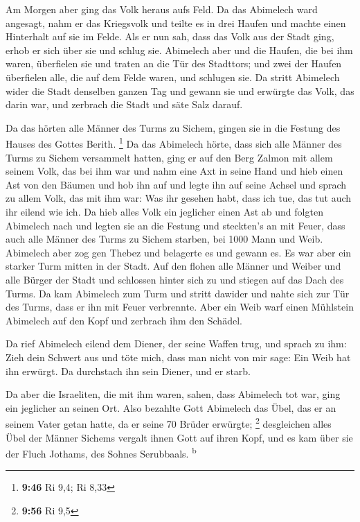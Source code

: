  Am Morgen aber ging das Volk heraus aufs Feld. Da das
Abimelech ward angesagt,  nahm er das Kriegsvolk und
teilte es in drei Haufen und machte einen Hinterhalt auf sie im Felde.
Als er nun sah, dass das Volk aus der Stadt ging, erhob er sich über sie
und schlug sie.  Abimelech aber und die Haufen, die bei
ihm waren, überfielen sie und traten an die Tür des Stadttors; und zwei
der Haufen überfielen alle, die auf dem Felde waren, und schlugen sie.
 Da stritt Abimelech wider die Stadt denselben ganzen Tag
und gewann sie und erwürgte das Volk, das darin war, und zerbrach die
Stadt und säte Salz darauf.

 Da das hörten alle Männer des Turms zu Sichem, gingen
sie in die Festung des Hauses des Gottes Berith. \footnote{\textbf{9:46}
  Ri 9,4; Ri 8,33}  Da das Abimelech hörte, dass sich
alle Männer des Turms zu Sichem versammelt hatten,  ging
er auf den Berg Zalmon mit allem seinem Volk, das bei ihm war und nahm
eine Axt in seine Hand und hieb einen Ast von den Bäumen und hob ihn auf
und legte ihn auf seine Achsel und sprach zu allem Volk, das mit ihm
war: Was ihr gesehen habt, dass ich tue, das tut auch ihr eilend wie
ich.  Da hieb alles Volk ein jeglicher einen Ast ab und
folgten Abimelech nach und legten sie an die Festung und steckten's an
mit Feuer, dass auch alle Männer des Turms zu Sichem starben, bei 1000
Mann und Weib.  Abimelech aber zog gen Thebez und
belagerte es und gewann es.  Es war aber ein starker Turm
mitten in der Stadt. Auf den flohen alle Männer und Weiber und alle
Bürger der Stadt und schlossen hinter sich zu und stiegen auf das Dach
des Turms.  Da kam Abimelech zum Turm und stritt dawider
und nahte sich zur Tür des Turms, dass er ihn mit Feuer verbrennte.
 Aber ein Weib warf einen Mühlstein Abimelech auf den
Kopf und zerbrach ihm den Schädel.

 Da rief Abimelech eilend dem Diener, der seine Waffen
trug, und sprach zu ihm: Zieh dein Schwert aus und töte mich, dass man
nicht von mir sage: Ein Weib hat ihn erwürgt. Da durchstach ihn sein
Diener, und er starb.

 Da aber die Israeliten, die mit ihm waren, sahen, dass
Abimelech tot war, ging ein jeglicher an seinen Ort. 
Also bezahlte Gott Abimelech das Übel, das er an seinem Vater getan
hatte, da er seine 70 Brüder erwürgte; \footnote{\textbf{9:56} Ri 9,5}
 desgleichen alles Übel der Männer Sichems vergalt ihnen
Gott auf ihren Kopf, und es kam über sie der Fluch Jothams, des Sohnes
Serubbaals. \textsuperscript{b}

